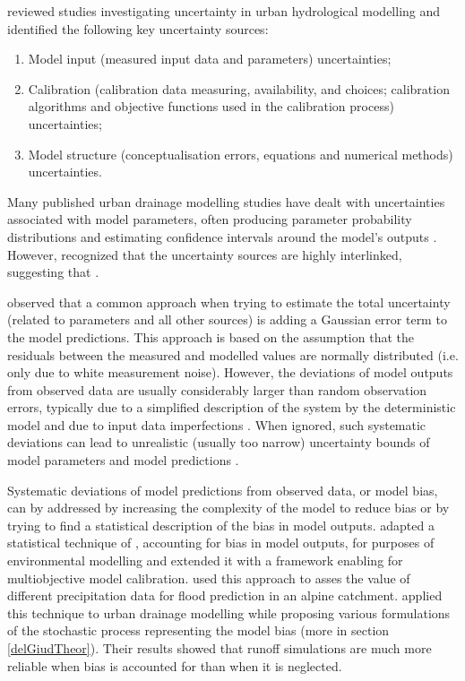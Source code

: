 \documentclass{ctuthesis}\usepackage[]{graphicx}\usepackage[]{color}
\begin{document}
\cite{deleticAssessingUncertaintiesUrban2012} reviewed studies investigating uncertainty in urban hydrological modelling and identified the following key uncertainty sources:
\begin{enumerate}
        \item Model input (measured input data and parameters) uncertainties;
        \item Calibration (calibration data measuring, availability, and choices; calibration algorithms and objective functions used in the calibration process) uncertainties;
        \item Model structure (conceptualisation errors, equations and numerical methods) uncertainties. 
\end{enumerate}

Many published urban drainage modelling studies have dealt with uncertainties associated with model parameters, often producing parameter probability distributions and estimating confidence intervals around the model’s outputs \citep[e.g.][]{thorndahlEventBasedUncertainty2008, dotto2012comparison}. However, \cite{deleticAssessingUncertaintiesUrban2012} recognized that the uncertainty sources are highly interlinked, suggesting that .

\cite{dotto2012comparison} observed that a common approach when trying to estimate the total uncertainty (related to parameters and all other sources) is adding a Gaussian error term to the model predictions. This approach is based on the assumption that the residuals between the measured and modelled values are normally distributed (i.e. only due to white measurement noise). However, the deviations of model outputs from observed data are usually considerably larger than random observation errors, typically due to a simplified description of the system by the deterministic model and due to input data imperfections \citep{reichert2012linking}. When ignored, such systematic deviations can lead to unrealistic (usually too narrow) uncertainty bounds of model parameters and model predictions \citep{reichert2012linking}.

Systematic deviations of model predictions from observed data, or model bias, can by addressed by increasing the complexity of the model to reduce bias or by trying to find a statistical description of the bias in model outputs. \cite{reichert2012linking} adapted a statistical technique of \cite{kennedy2001bayesian}, accounting for bias in model outputs, for purposes of environmental modelling and extended it with a framework enabling for multiobjective model calibration. \cite{sikorskaValueDifferentPrecipitation2018} used this approach to asses the value of different precipitation data for flood prediction in an alpine catchment. \cite{giudice2013improving} applied this technique to urban drainage modelling while proposing various formulations of the stochastic process representing the model bias (more in section \ref{delGiudTheor}). Their results showed that runoff simulations are much more reliable when bias is accounted for than when it is neglected. 
\end{document}
